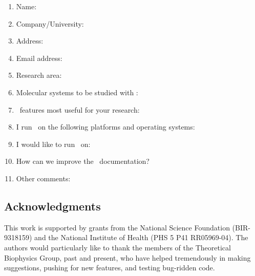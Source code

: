 \newpage
\begin{enumerate}

\item Name:

\item Company/University:

\item Address:

\kern 0.4in

\item Email address:

\item Research area:

\kern 0.3in

\item Molecular systems to be studied with \NAMD:

\kern 0.4in

\item \NAMD\ features most useful for your research:

\kern 0.4in

\item I run \NAMD\ on the following platforms and operating systems:

\kern 0.5in

\item I would like to run \NAMD\ on:

\kern 0.2in

\item How can we improve the \NAMD\ documentation?

\kern 1.2in

\item Other comments:

\end{enumerate}
\newpage

\subsection{Acknowledgments}

This work is supported by grants from the National Science
Foundation (BIR-9318159) and the National Institute of Health 
(PHS 5 P41 RR05969-04).
\prettypar
The authors would particularly like to thank the members of the
Theoretical Biophysics Group, past and present, who have helped
tremendously in making suggestions, pushing for new features, and
testing bug-ridden code.

